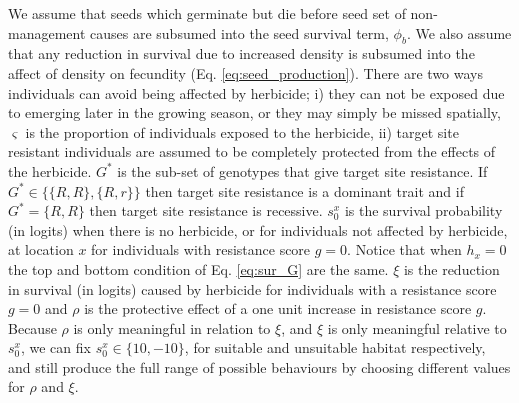 \documentclass[10pt,letterpaper]{article}
\begin{document}
We assume that seeds which germinate but die before seed set of non-management causes are subsumed into the seed survival term, $\phi_b$. We also assume that any reduction in survival due to increased density is subsumed into the affect of density on fecundity (Eq. \ref{eq:seed_production}). There are two ways individuals can avoid being affected by herbicide; i) they can not be exposed due to emerging later in the growing season, or they may simply be missed spatially, $\varsigma$ is the proportion of individuals exposed to the herbicide, ii) target site resistant individuals are assumed to be completely protected from the effects of the herbicide. $G^*$ is the sub-set of genotypes that give target site resistance. If $G^* \in \{\{R, R\}, \{R, r\}\}$ then target site resistance is a dominant trait and if $G^* = \{R, R\}$ then target site resistance is recessive. $s_0^x$ is the survival probability (in logits) when there is no herbicide, or for individuals not affected by herbicide, at location $x$ for individuals with resistance score $g = 0$. Notice that when $h_x = 0$ the top and bottom condition of Eq. \ref{eq:sur_G} are the same. $\xi$ is the reduction in survival (in logits) caused by herbicide for individuals with a resistance score $g = 0$ and $\rho$ is the protective effect of a one unit increase in resistance score $g$. Because $\rho$ is only meaningful in relation to $\xi$, and $\xi$ is only meaningful relative to $s_0^x$, we can fix $s_0^x \in \{10, -10\}$, for suitable and unsuitable habitat respectively, and still produce the full range of possible behaviours by choosing different values for $\rho$ and $\xi$. 
\end{document}
